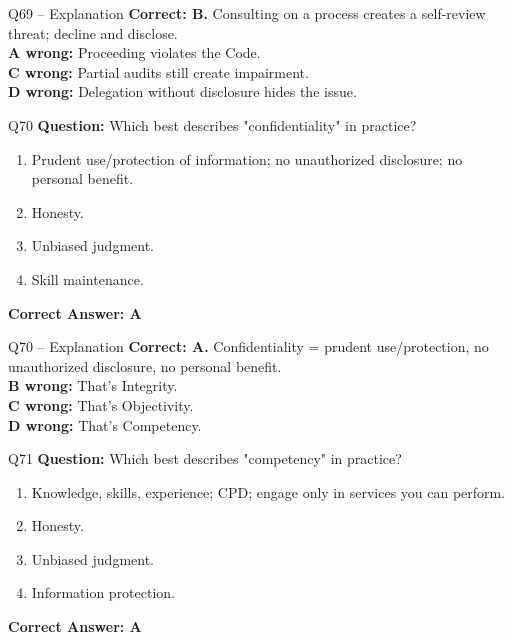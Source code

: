 \documentclass[aspectratio=169,10pt]{beamer}
\begin{document}
	\begin{frame}[t]{Q69 -- Explanation}
		\small
		\textbf{Correct: B.} Consulting on a process creates a self-review threat; decline and disclose. \\[4pt]
		\textbf{A wrong:} Proceeding violates the Code. \\[2pt]
		\textbf{C wrong:} Partial audits still create impairment. \\[2pt]
		\textbf{D wrong:} Delegation without disclosure hides the issue.
	\end{frame}
	
	\begin{frame}[t]{Q70}
		\small
		\textbf{Question:} Which best describes "confidentiality" in practice?
		\begin{enumerate}[label=\Alph*.,itemsep=1pt,topsep=2pt]
			\item Prudent use/protection of information; no unauthorized disclosure; no personal benefit.
			\item Honesty.
			\item Unbiased judgment.
			\item Skill maintenance.
		\end{enumerate}
		\vspace{4pt}
		\textbf{Correct Answer: A}
	\end{frame}
	
	\begin{frame}[t]{Q70 -- Explanation}
		\small
		\textbf{Correct: A.} Confidentiality = prudent use/protection, no unauthorized disclosure, no personal benefit. \\[4pt]
		\textbf{B wrong:} That's Integrity. \\[2pt]
		\textbf{C wrong:} That's Objectivity. \\[2pt]
		\textbf{D wrong:} That's Competency.
	\end{frame}
	
	\begin{frame}[t]{Q71}
		\small
		\textbf{Question:} Which best describes "competency" in practice?
		\begin{enumerate}[label=\Alph*.,itemsep=1pt,topsep=2pt]
			\item Knowledge, skills, experience; CPD; engage only in services you can perform.
			\item Honesty.
			\item Unbiased judgment.
			\item Information protection.
		\end{enumerate}
		\vspace{4pt}
		\textbf{Correct Answer: A}
	\end{frame}
	
\end{document}
